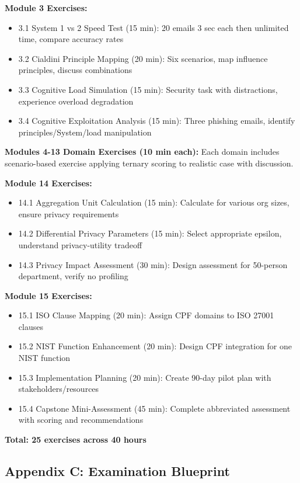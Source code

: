 \documentclass[11pt,a4paper]{article}
\begin{document}
\textbf{Module 3 Exercises:}
\begin{itemize}
\item 3.1 System 1 vs 2 Speed Test (15 min): 20 emails 3 sec each then unlimited time, compare accuracy rates
\item 3.2 Cialdini Principle Mapping (20 min): Six scenarios, map influence principles, discuss combinations
\item 3.3 Cognitive Load Simulation (15 min): Security task with distractions, experience overload degradation
\item 3.4 Cognitive Exploitation Analysis (15 min): Three phishing emails, identify principles/System/load manipulation
\end{itemize}

\textbf{Modules 4-13 Domain Exercises (10 min each):}
Each domain includes scenario-based exercise applying ternary scoring to realistic case with discussion.

\textbf{Module 14 Exercises:}
\begin{itemize}
\item 14.1 Aggregation Unit Calculation (15 min): Calculate for various org sizes, ensure privacy requirements
\item 14.2 Differential Privacy Parameters (15 min): Select appropriate epsilon, understand privacy-utility tradeoff
\item 14.3 Privacy Impact Assessment (30 min): Design assessment for 50-person department, verify no profiling
\end{itemize}

\textbf{Module 15 Exercises:}
\begin{itemize}
\item 15.1 ISO Clause Mapping (20 min): Assign CPF domains to ISO 27001 clauses
\item 15.2 NIST Function Enhancement (20 min): Design CPF integration for one NIST function
\item 15.3 Implementation Planning (20 min): Create 90-day pilot plan with stakeholders/resources
\item 15.4 Capstone Mini-Assessment (45 min): Complete abbreviated assessment with scoring and recommendations
\end{itemize}

\textbf{Total: 25 exercises across 40 hours}

\subsection{Appendix C: Examination Blueprint}
\end{document}
